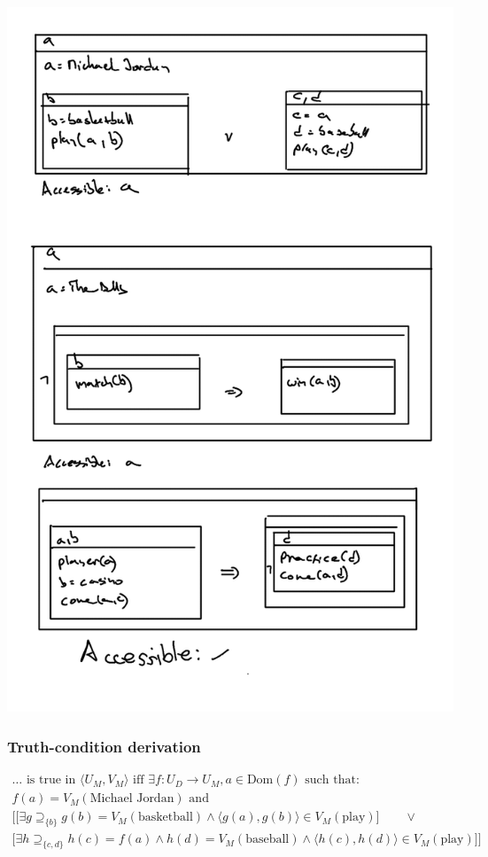 \documentclass{article}
\begin{document}

\section{}


\centering
\includegraphics[width=0.8\linewidth]{semantics.png}

\raggedright
\subsubsection*{Truth-condition derivation}

\begin{gather*}
\ldots \text{ is true in } \langle{} U_M, V_M \rangle{} \text{ iff } \exists f: U_D \rightarrow U_M, a \in \text{Dom}(f) \text{ such that: } \\
f(a) = V_M(\text{Michael Jordan}) \text{ and } \\
\bigg[
\big[ \exists g \supseteq_{\{b\}} g(b) = V_M(\text{basketball}) \wedge \langle{} g(a),g(b) \rangle{} \in V_M(\text{play}) \big] \qquad 
\vee \\
\big[ \exists h \supseteq_{\{c, d\}} h(c) = f(a) \wedge h(d) = V_M(\text{baseball}) \wedge \langle{} h(c),h(d) \rangle{} \in V_M(\text{play}) \big]
\bigg]
\end{gather*}
\end{document}
